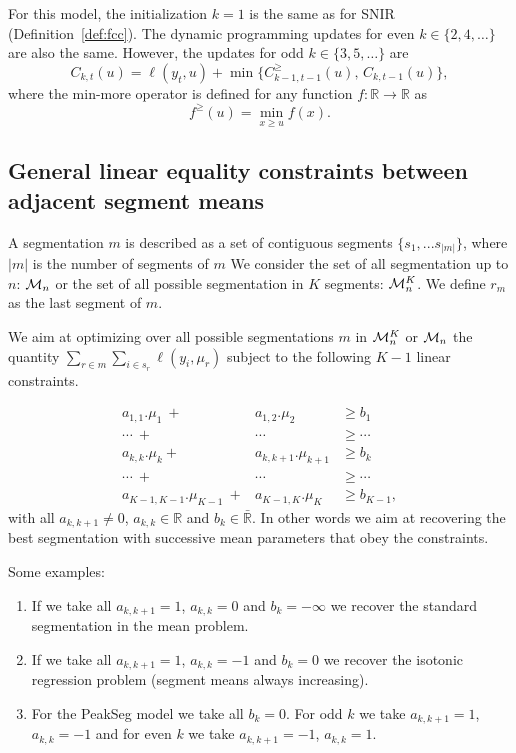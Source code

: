 \documentclass{article}
\newcommand{\RR}{\mathbb R}
\begin{document}
For this model, the initialization $k=1$ is the same as for SNIR
(Definition~\ref{def:fcc}). The dynamic programming updates for even
$k\in\{2, 4, \dots\}$ are also the same. However, the updates for odd
$k\in\{3, 5, \dots\}$ are
\begin{equation}
  C_{k,t}(u) = \ell(y_t, u) + \min\{
  C_{k-1,t-1}^\geq(u),\, C_{k,t-1}(u)
  \},
\end{equation}
where the min-more operator is defined for any function $f:\RR\rightarrow\RR$ as
\begin{equation}
  \label{eq:min-more-def}
  f^\geq(u) = \min_{x\geq u} f(x).
\end{equation}


\subsection{General linear equality constraints
  between adjacent segment means}

A segmentation $m$ is described as a set of contiguous segments $\{s_1, ... s_{|m|} \}$, where $|m|$ is the number of segments of $m$
We consider the set of all segmentation up to $n$: $\mathcal{M}_n$ 
or the set of all possible segmentation in $K$ segments: $\mathcal{M}^K_n$.
We define $r_m$ as the last segment of $m$.

We aim at optimizing over all possible segmentations $m$ in $\mathcal{M}^K_n$ or $\mathcal{M}_n$
 the quantity
$\sum_{r \in m} \sum_{i \in s_{r}} \ell(y_i, \mu_{r})$ subject to
the following $K-1$ linear constraints. 

\begin{eqnarray*}
a_{1,1}.\mu_1 \ + & a_{1,2}.\mu_2  & \geq  b_1 \\
\cdots \ +&  \cdots & \geq \cdots \\
a_{k,k}.\mu_{k} + & a_{k,k+1}.\mu_{k+1}  & \geq  b_{k} \\
\cdots \ +&  \cdots & \geq \cdots  \\
a_{K-1,K-1}.\mu_{K-1} \ +& a_{K-1,K}.\mu_K & \geq  b_{K-1},
\end{eqnarray*}
with all $a_{k,k+1} \neq 0$, $a_{k,k} \in \mathbb{R}$ and
$b_{k} \in \bar{\mathbb{R}}.$ In other words we aim at recovering the
best segmentation with successive mean parameters that obey the
constraints.

Some examples:
\begin{enumerate}
\item If we take all $a_{k,k+1} =1$, $a_{k,k}=0$ and $b_{k} = - \infty$ we recover the standard segmentation in the mean problem.
\item If we take all $a_{k,k+1} =1$, $a_{k,k}=-1$ and $b_{k} = 0$ we
  recover the isotonic regression problem (segment means always
  increasing).
\item For the PeakSeg model we take all $b_{k} = 0$. For odd $k$ we
  take $a_{k,k+1} =1$, $a_{k,k}=-1$ and for even $k$ we take
  $a_{k,k+1} =-1$, $a_{k,k}=1$.
\end{enumerate}
\end{document}
